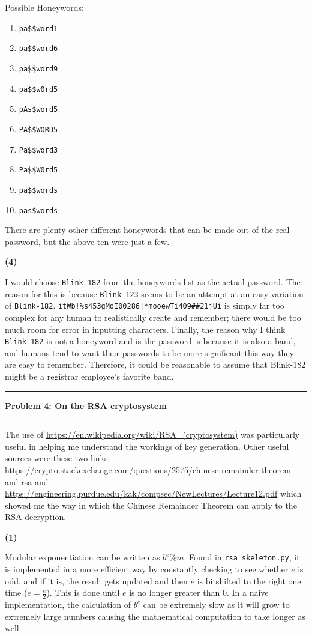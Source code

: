 \documentclass[11pt]{article}
\newcommand\question[2]{\vspace{.25in}\hrule\textbf{#1: #2}\vspace{.5em}\hrule\vspace{.10in}}
\renewcommand\part[1]{\vspace{.10in}\textbf{(#1)}\par}
\begin{document}
		Possible Honeywords: 
		\begin{enumerate}
			\item \texttt{pa\$\$word1}
			\item \texttt{pa\$\$word6}
			\item \texttt{pa\$\$word9}
			\item \texttt{pa\$\$w0rd5}
			\item \texttt{pAs\$word5}
			\item \texttt{PA\$\$WORD5}
			\item \texttt{Pa\$\$word3}
			\item \texttt{Pa\$\$W0rd5}
			\item \texttt{pa\$\$words}
			\item \texttt{pas\$words}
		\end{enumerate}

		There are plenty other different honeywords that can be made out of the real password, but the above ten were just a few.

	\part{4}
		I would choose \texttt{Blink-182} from the honeywords list as the actual password. The reason for this is because \texttt{Blink-123} seems to be an attempt at an easy variation of \texttt{Blink-182}. \texttt{itWb!\%s453gMoI00286!*mooewTi409\#\#21jUi} is simply far too complex for any human to realistically create and remember; there would be too much room for error in inputting characters. Finally, the reason why I think \texttt{Blink-182} is not a honeyword and is the password is because it is also a band, and humans tend to want their passwords to be more significant this way they are easy to remember. Therefore, it could be reasonable to assume that Blink-182 might be a registrar employee's favorite band.


\question{Problem 4}{On the RSA cryptosystem}
	The use of \url{https://en.wikipedia.org/wiki/RSA_(cryptosystem)} was particularly useful in helping me understand the workings of key generation. Other useful sources were these two links \url{https://crypto.stackexchange.com/questions/2575/chinese-remainder-theorem-and-rsa} and \url{https://engineering.purdue.edu/kak/compsec/NewLectures/Lecture12.pdf} which showed me the way in which the Chinese Remainder Theorem can apply to the RSA decryption.

	\part{1}
		Modular exponentiation can be written as $b^e\%m$. Found in \texttt{rsa\_skeleton.py}, it is implemented in a more efficient way by constantly checking to see whether $e$ is odd, and if it is, the result gets updated and then $e$ is bitshifted to the right one time ($e=\frac{e}{2}$). This is done until $e$ is no longer greater than 0. In a naive implementation, the calculation of $b^e$ can be extremely slow as it will grow to extremely large numbers causing the mathematical computation to take longer as well. 
\end{document}
